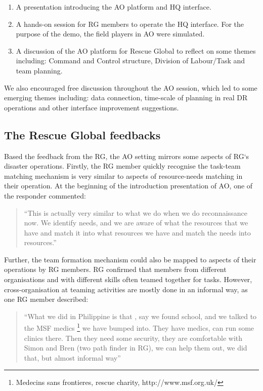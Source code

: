 \begin{enumerate}
	\item A presentation introducing the AO platform and HQ interface.
	\item A hands-on session for RG members to operate the HQ interface. For the purpose of the demo, the field players in AO were simulated.
	\item A discussion of the AO platform for Rescue Global to reflect on some themes including: Command and Control structure, Division of Labour/Task and team planning.
\end{enumerate} 

We also encouraged free discussion throughout the AO session, which led to some emerging themes including: data connection, time-scale of planning in real DR operations and other interface improvement suggestions.  

\subsection{The Rescue Global feedbacks}
Based the feedback from the \ac{RG}, the \ac{AO} setting  mirrors some aspects of \ac{RG}`s disaster operations. Firstly, the \ac{RG} member quickly recognise the task-team matching mechanism is very similar to aspects of resource-needs matching in their operation. At the beginning of the introduction presentation of \ac{AO}, one of the responder commented: \\

\begin{quotation}
``This is actually very similar to what we do when we do reconnaissance now. We identify needs, and we are aware of what the resources that we have and match it into what resources we have and match the needs into resources.''\\
\end{quotation}

Further, the team formation mechanism could also be mapped to aspects of their operations by \ac{RG} members. \ac{RG} confirmed that members from different organisations and with different skills often teamed together for tasks. However, cross-organisation at teaming activities are mostly done in an informal way, as one \ac{RG} member described: \\

\begin{quotation}
``What we did in Philippine is that , say we found school, and we talked to the MSF medics \footnote{Medecins sans frontieres, rescue charity, http://www.msf.org.uk/ } we have bumped into. They have medics, can run some clinics there. Then they need some security, they are comfortable with Simon and Bren (two path finder in \ac{RG}), we can help them out, we did that, but almost informal way'' \\
\end{quotation}

